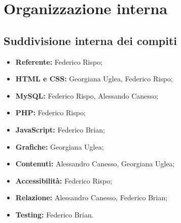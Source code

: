\section{Organizzazione interna}
	\subsection{Suddivisione interna dei compiti}
	\begin{itemize}
		\item \textbf{Referente:} Federico Rispo;
		\item \textbf{HTML e CSS:} Georgiana Uglea, Federico Rispo;
		\item \textbf{MySQL:} Federico Rispo, Alessando Canesso;
		\item \textbf{PHP:} Federico Rispo;
		\item \textbf{JavaScript:} Federico Brian;
		\item \textbf{Grafiche:} Georgiana Uglea;
		\item \textbf{Contenuti:} Alessandro Canesso, Georgiana Uglea;
		\item \textbf{Accessibilità:} Federico Rispo;
		\item \textbf{Relazione:} Alessandro Canesso, Federico Brian;
		\item \textbf{Testing:} Federico Brian.
	\end{itemize}
